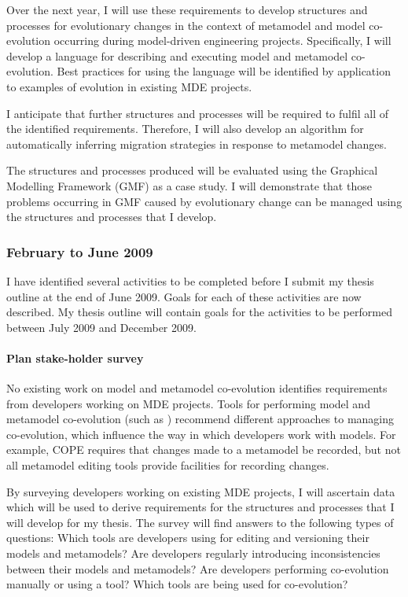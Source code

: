 Over the next year, I will use these requirements to develop structures and processes for evolutionary changes in the context of metamodel and model co-evolution occurring during model-driven engineering projects. Specifically, I will develop a language for describing and executing model and metamodel co-evolution. Best practices for using the language will be identified by application to examples of evolution in existing MDE projects.

I anticipate that further structures and processes will be required to fulfil all of the identified requirements. Therefore, I will also develop an algorithm for automatically inferring migration strategies in response to metamodel changes.

The structures and processes produced will be evaluated using the Graphical Modelling Framework (GMF) \cite{gronback06gmf} as a case study. I will demonstrate that those problems occurring in GMF caused by evolutionary change can be managed using the structures and processes that I develop.

\subsubsection{February to June 2009}
I have identified several activities to be completed before I submit my thesis outline at the end of June 2009. Goals for each of these activities are now described. My thesis outline will contain goals for the activities to be performed between July 2009 and December 2009.

\paragraph{Plan stake-holder survey} %
\label{par:plan_stakeholder_survey}
No existing work on model and metamodel co-evolution identifies requirements from developers working on MDE projects. Tools for performing model and metamodel co-evolution (such as \cite{herrmannsdoerfer08cope,cicchetti08automating}) recommend different approaches to managing co-evolution, which influence the way in which developers work with models. For example, COPE \cite{herrmannsdoerfer08cope} requires that changes made to a metamodel be recorded, but not all metamodel editing tools provide facilities for recording changes.

By surveying developers working on existing MDE projects, I will ascertain data which will be used to derive requirements for the structures and processes that I will develop for my thesis. The survey will find answers to the following types of questions: Which tools are developers using for editing and versioning their models and metamodels? Are developers regularly introducing inconsistencies between their models and metamodels? Are developers performing co-evolution manually or using a tool? Which tools are being used for co-evolution?

